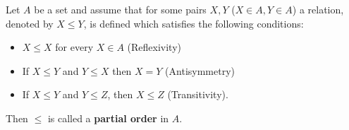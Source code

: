 Let $A$ be a set and assume that for some pairs $X, Y$ ($X \in A, Y \in A$) a relation, denoted by $X \leq Y$, is defined which satisfies the following conditions:

\begin{itemize}
  \item[(i)] $X \leq X$ for every $X \in A$ \quad (Reflexivity)
  \item[(ii)] If $X \leq Y$ and $Y \leq X$ then $X = Y$ \quad (Antisymmetry)
  \item[(iii)] If $X \leq Y$ and $Y \leq Z$, then $X \leq Z$ \quad (Transitivity).
\end{itemize}

Then $\leq$ is called a \textbf{partial order} in $A$.
